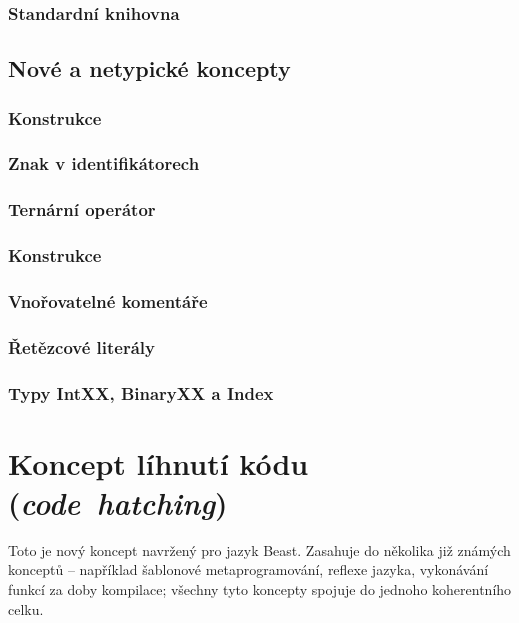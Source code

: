 \subsection{Standardní knihovna}

\section{Nové a netypické koncepty}

\subsection{Konstrukce }

\subsection{Znak \inlineCode{\#} v identifikátorech}

\subsection{Ternární operátor} \label{ternary}

\subsection{Konstrukce }

\subsection{Vnořovatelné komentáře}

\subsection{Řetězcové literály}

\subsection{Typy IntXX, BinaryXX a Index}

\chapter{Koncept líhnutí kódu (\textit{code~hatching})} \label{ctime}
Toto je nový koncept navržený pro jazyk Beast. Zasahuje do několika již známých konceptů -- například šablonové metaprogramování, reflexe jazyka, vykonávání funkcí za doby kompilace; všechny tyto koncepty spojuje do jednoho koherentního celku.

